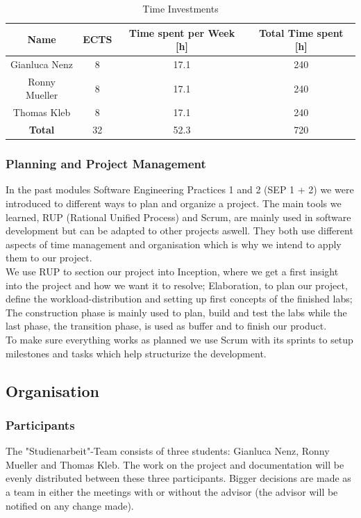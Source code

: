 \begin{table}
    \centering
    \begin{tabular}{||c c c c||} 
        \hline
        Name & ECTS & Time spent per Week [h] & Total Time spent [h]\\ [0.5ex] 
        \hline\hline
        Gianluca Nenz & 8 & 17.1 & 240 \\ 
        \hline
        Ronny Mueller & 8 & 17.1 & 240 \\
        \hline
        Thomas Kleb & 8 & 17.1 & 240 \\ 
        \hline
        \textbf{Total} & 32 & 52.3 & 720 \\[1ex] 
        \hline
    \end{tabular}
    \caption{Time Investments}
    \label{time_ects}
\end{table}

\subsubsection*{Planning and Project Management}
In the past modules Software Engineering Practices 1 and 2 (SEP 1 + 2) we were introduced to different ways to plan and organize a project. The main tools we learned, RUP (Rational Unified Process) and Scrum, are mainly used in software development but can be adapted to other projects aswell. They both use different aspects of time management and organisation which is why we intend to apply them to our project. \\
We use RUP to section our project into Inception, where we get a first insight into the project and how we want it to resolve; Elaboration, to plan our project, define the workload-distribution and setting up first concepts of the finished labs; The construction phase is mainly used to plan, build and test the labs while the last phase, the transition phase, is used as buffer and to finish our product. \\ 
To make sure everything works as planned we use Scrum with its sprints to setup milestones and tasks which help structurize the development. 

\subsection{Organisation}

\subsubsection*{Participants}
The "Studienarbeit"-Team consists of three students: Gianluca Nenz, Ronny Muel\-ler and Thomas Kleb. The work on the project and documentation will be evenly distributed between these three participants. Bigger decisions are made as a team in either the meetings with or without the advisor (the advisor will be notified on any change made).

